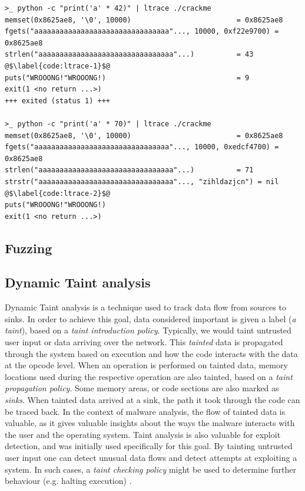 \begin{lstlisting}[caption={ltrace (``a library call tracer'') output of an obfuscated crackme. One can observe a length check in the first execution, and different output when an input of the expected length is provided.}, label={code:ltrace}]
>_ python -c "print('a' * 42)" | ltrace ./crackme
memset(0x8625ae8, '\0', 10000)                         = 0x8625ae8
fgets("aaaaaaaaaaaaaaaaaaaaaaaaaaaaaaaa"..., 10000, 0xf22e9700) = 0x8625ae8
strlen("aaaaaaaaaaaaaaaaaaaaaaaaaaaaaaaa"...)          = 43 @$\label{code:ltrace-1}$@
puts("WROOONG!"WROOONG!)                               = 9
exit(1 <no return ...>)
+++ exited (status 1) +++

>_ python -c "print('a' * 70)" | ltrace ./crackme
memset(0x8625ae8, '\0', 10000)                         = 0x8625ae8
fgets("aaaaaaaaaaaaaaaaaaaaaaaaaaaaaaaa"..., 10000, 0xedcf4700) = 0x8625ae8
strlen("aaaaaaaaaaaaaaaaaaaaaaaaaaaaaaaa"...)          = 71
strstr("aaaaaaaaaaaaaaaaaaaaaaaaaaaaaaaa"..., "zihldazjcn") = nil @$\label{code:ltrace-2}$@
puts("WROOONG!"WROOONG!)
exit(1 <no return ...>)
\end{lstlisting}

\subsection{Fuzzing}

\subsection{Dynamic Taint analysis}

Dynamic Taint analysis is a technique used to track data flow from sources to sinks. In order to achieve this goal, data considered important is given a label (\emph{a taint}), based on a \emph{taint introduction policy}. Typically, we would taint untrusted user input or data arriving over the network. This \emph{tainted} data is propagated through the system based on execution and how the code interacts with the data at the opcode level. When an operation is performed on tainted data, memory locations used during the respective operation are also tainted, based on a \emph{taint propagation policy}. Some memory areas, or code sections are also marked as \emph{sinks}. When tainted data arrived at a sink, the path it took through the code can be traced back. In the context of malware analysis, the flow of tainted data is valuable, as it gives valuable insights about the ways the malware interacts with the user and the operating system. Taint analysis is also valuable for exploit detection, and was initially used specifically for this goal. By tainting untrusted user input one can detect unusual data flows and detect attempts at exploiting a system. In such cases, a \emph{taint checking policy} might be used to determine further behaviour (e.g. halting execution) \cite{da_survey_2019} \cite{all_about_taint_2010}.

